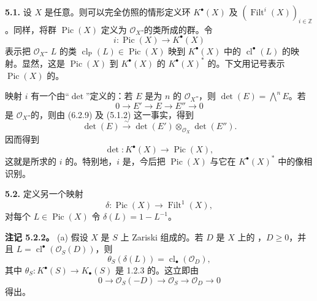 \textbf{5.1.} 设 $X$ 是任意。则可以完全仿照的情形定义环 $K^\bullet(X)$ 及 $(\operatorname{Filt}^i(X))_{i\in\mathbb Z}$。同样，将群 $\operatorname{Pic}(X)$ 定义为 $\mathcal O_X$-的类所成的群。令
\[i:\operatorname{Pic}(X)\longrightarrow K^\bullet(X)\tag{5.1.1}\]
表示把 $\mathcal O_X$- $L$ 的类 $\operatorname{cl}_{\mathrm P}(L)\in\operatorname{Pic}(X)$ 映到 $K^\bullet(X)$ 中的 $\operatorname{cl}^\bullet(L)$ 的映射。显然，这是 $\operatorname{Pic}(X)$ 到 $K^\bullet(X)$ 的 $K^\bullet(X)^*$ 的。下文用记号表示 $\operatorname{Pic}(X)$ 的。

映射 $i$ 有一个由“$\det$”定义的：若 $E$ 是为 $n$ 的 $\mathcal O_X$-，则 $\det(E)=\bigwedge^nE$。若
\[0\longrightarrow E'\longrightarrow E\longrightarrow E''\longrightarrow0\tag{5.1.2}\]
是 $\mathcal O_X$-的，则由 (6.2.9) 及 (5.1.2) 这一事实，得到
\[\det(E)\xrightarrow{\sim}\det(E')\otimes_{\mathcal O_X}\det(E'').\]
因而得到
\[\det:K^\bullet(X)\longrightarrow\operatorname{Pic}(X),\tag{5.1.3}\]
这就是所求的 $i$ 的。特别地，$i$ 是，今后把 $\operatorname{Pic}(X)$ 与它在 $K^\bullet(X)^*$ 中的像相识别。

\textbf{5.2.} 定义另一个映射
\[\delta:\operatorname{Pic}(X)\longrightarrow\operatorname{Filt}^1(X),\tag{5.2.1}\]
对每个 $L\in\operatorname{Pic}(X)$ 令 $\delta(L)=1-L^{-1}$。

\textbf{注记 5.2.2。} (a) 假设 $X$ 是 $S$ 上 Zariski 组成的。若 $D$ 是 $X$ 上的 ，$D\geq0$，并且 $L=\operatorname{cl}^\bullet(\mathcal O_S(D))$，则
\[\theta_S(\delta(L))=\operatorname{cl}_\bullet(\mathcal O_D),\tag{5.2.3}\]
其中 $\theta_S:K^\bullet(S)\longrightarrow K_\bullet(S)$ 是 1.2.3 的。这立即由
\[0\longrightarrow\mathcal O_S(-D)\longrightarrow\mathcal O_S\longrightarrow\mathcal O_D\longrightarrow0\]
得出。

